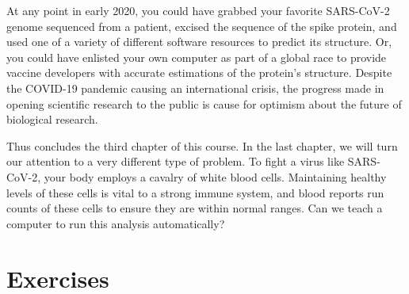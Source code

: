 At any point in early 2020, you could have grabbed your favorite SARS-CoV-2 genome sequenced from a patient, excised the sequence of the spike protein, and used one of a variety of different software resources to predict its structure. Or, you could have enlisted your own computer as part of a global race to provide vaccine developers with accurate estimations of the protein's structure. Despite the COVID-19 pandemic causing an international crisis, the progress made in opening scientific research to the public is cause for optimism about the future of biological research.

Thus concludes the third chapter of this course. In the last chapter, we will turn our attention to a very different type of problem. To fight a virus like SARS-CoV-2, your body employs a cavalry of white blood cells. Maintaining healthy levels of these cells is vital to a strong immune system, and blood reports run counts of these cells to ensure they are within normal ranges. Can we teach a computer to run this analysis automatically?

\begin{note}\end{note}

\FloatBarrier
\section{Exercises}
\label{sec:coronavirus_exercises}

\begin{exercise}\end{exercise}
